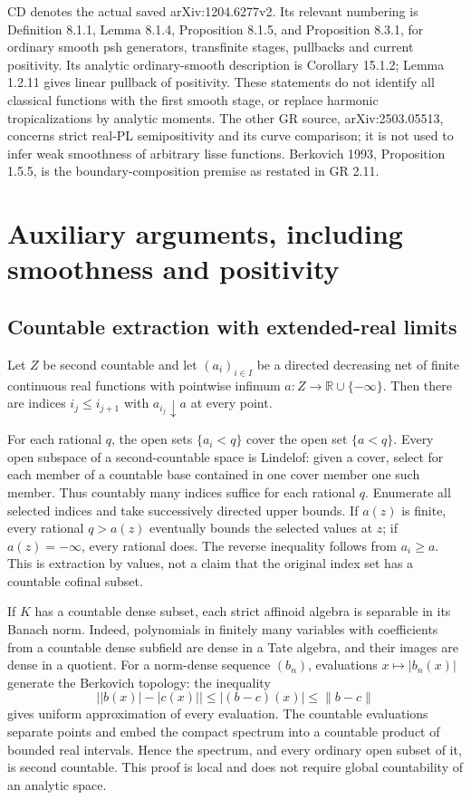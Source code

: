 \documentclass[11pt]{article}
\begin{document}
CD denotes the actual saved arXiv:1204.6277v2. Its relevant numbering is Definition 8.1.1, Lemma 8.1.4, Proposition 8.1.5, and Proposition 8.3.1, for ordinary smooth psh generators, transfinite stages, pullbacks and current positivity. Its analytic ordinary-smooth description is Corollary 15.1.2; Lemma 1.2.11 gives linear pullback of positivity. These statements do not identify all classical functions with the first smooth stage, or replace harmonic tropicalizations by analytic moments. The other GR source, arXiv:2503.05513, concerns strict real-PL semipositivity and its curve comparison; it is not used to infer weak smoothness of arbitrary lisse functions. Berkovich 1993, Proposition 1.5.5, is the boundary-composition premise as restated in GR 2.11.

\section{Auxiliary arguments, including smoothness and positivity}

\subsection{Countable extraction with extended-real limits}

Let \(Z\) be second countable and let \((a_i)_{i\in I}\) be a directed decreasing net of finite continuous real functions with pointwise infimum \(a:Z\to\mathbb R\cup\{-\infty\}\). Then there are indices \(i_j\le i_{j+1}\) with \(a_{i_j}\downarrow a\) at every point.

For each rational \(q\), the open sets \(\{a_i<q\}\) cover the open set \(\{a<q\}\). Every open subspace of a second-countable space is Lindelof: given a cover, select for each member of a countable base contained in one cover member one such member. Thus countably many indices suffice for each rational \(q\). Enumerate all selected indices and take successively directed upper bounds. If \(a(z)\) is finite, every rational \(q>a(z)\) eventually bounds the selected values at \(z\); if \(a(z)=-\infty\), every rational does. The reverse inequality follows from \(a_i\ge a\). This is extraction by values, not a claim that the original index set has a countable cofinal subset.

If \(K\) has a countable dense subset, each strict affinoid algebra is separable in its Banach norm. Indeed, polynomials in finitely many variables with coefficients from a countable dense subfield are dense in a Tate algebra, and their images are dense in a quotient. For a norm-dense sequence \((b_n)\), evaluations \(x\mapsto |b_n(x)|\) generate the Berkovich topology: the inequality
\[
\big||b(x)|-|c(x)|\big|\le |(b-c)(x)|\le\|b-c\|
\]
gives uniform approximation of every evaluation. The countable evaluations separate points and embed the compact spectrum into a countable product of bounded real intervals. Hence the spectrum, and every ordinary open subset of it, is second countable. This proof is local and does not require global countability of an analytic space.
\end{document}
